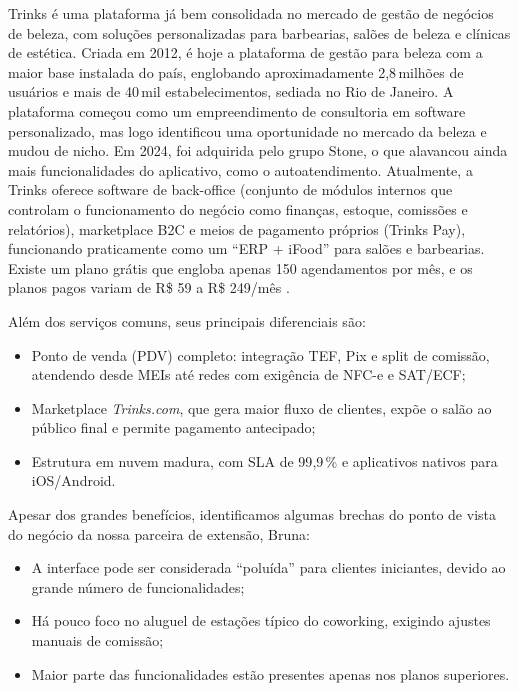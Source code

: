 Trinks é uma plataforma já bem consolidada no mercado de gestão de negócios de beleza, com soluções
personalizadas para barbearias, salões de beleza e clínicas de estética. Criada em 2012, é hoje a
plataforma de gestão para beleza com a maior base instalada do país, englobando aproximadamente
2,8\,milhões de usuários e mais de 40\,mil estabelecimentos, sediada no Rio de Janeiro. A plataforma começou como um empreendimento de consultoria em software personalizado, mas logo identificou uma oportunidade no mercado da beleza e mudou de nicho. Em 2024, foi adquirida pelo grupo Stone, o que alavancou ainda mais funcionalidades do aplicativo, como o autoatendimento.
Atualmente, a Trinks oferece software de back-office (conjunto de módulos internos que controlam o funcionamento do negócio como finanças, estoque, comissões e relatórios), marketplace B2C e meios de pagamento próprios (Trinks Pay), funcionando praticamente como um “ERP + iFood” para salões e barbearias. Existe um
plano grátis que engloba apenas 150 agendamentos por mês, e os planos pagos variam de R\$ 59 a R\$ 249/mês \cite{Trinks}.

Além dos serviços comuns, seus principais diferenciais são:

\begin{itemize}
	\item Ponto de venda (PDV) completo: integração TEF, Pix e split de comissão, atendendo desde
	MEIs até redes com exigência de NFC-e e SAT/ECF;
	\item Marketplace \textit{Trinks.com}, que gera maior fluxo de clientes, expõe o salão ao
	público final e permite pagamento antecipado;
	\item Estrutura em nuvem madura, com SLA de 99{,}9\,\% e aplicativos nativos para
	iOS/Android.
\end{itemize}

Apesar dos grandes benefícios, identificamos algumas brechas do ponto de vista do negócio da nossa
parceira de extensão, Bruna:

\begin{itemize}
	\item A interface pode ser considerada “poluída” para clientes iniciantes, devido ao grande
	número de funcionalidades;
	\item Há pouco foco no aluguel de estações típico do coworking, exigindo ajustes manuais de
	comissão;
	\item Maior parte das funcionalidades estão presentes apenas nos planos superiores.
\end{itemize}

